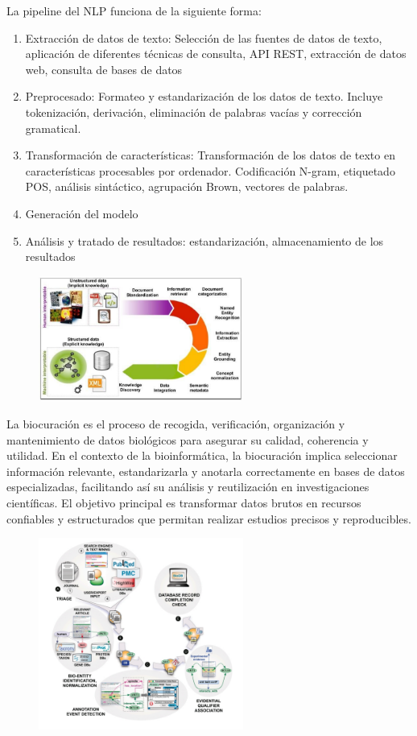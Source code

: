 La pipeline del NLP funciona de la siguiente forma:
\begin{enumerate}
\item Extracción de datos de texto: Selección de las fuentes de datos de texto, aplicación de diferentes técnicas de consulta, API REST, extracción de datos web, consulta de bases de datos
\item Preprocesado: Formateo y estandarización de los datos de texto. Incluye tokenización, derivación, eliminación de palabras vacías y corrección gramatical.
\item Transformación de características: Transformación de los datos de texto en características procesables por ordenador.
Codificación N-gram, etiquetado POS, análisis sintáctico, agrupación Brown, vectores de palabras.
\item Generación del modelo
\item Análisis y tratado de resultados: estandarización, almacenamiento de los resultados
\end{enumerate}

\begin{figure}[h]
\centering
\includegraphics[width = 0.6\textwidth]{figs/biocuration.png}
\end{figure}

La biocuración es el proceso de recogida, verificación, organización y mantenimiento de datos biológicos para asegurar su calidad, coherencia y utilidad. En el contexto de la bioinformática, la biocuración implica seleccionar información relevante, estandarizarla y anotarla correctamente en bases de datos especializadas, facilitando así su análisis y reutilización en investigaciones científicas. El objetivo principal es transformar datos brutos en recursos confiables y estructurados que permitan realizar estudios precisos y reproducibles.

\begin{figure}[h]
\centering
\includegraphics[width = 0.6\textwidth]{figs/biocuration2.png}
\end{figure}

